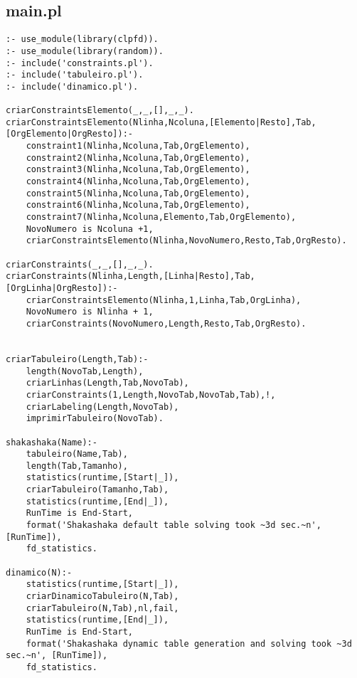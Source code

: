 \documentclass[runningheads]{llncs}
\begin{document}
\subsection{main.pl}
\begin{lstlisting}
:- use_module(library(clpfd)).
:- use_module(library(random)).
:- include('constraints.pl').
:- include('tabuleiro.pl').
:- include('dinamico.pl').

criarConstraintsElemento(_,_,[],_,_).
criarConstraintsElemento(Nlinha,Ncoluna,[Elemento|Resto],Tab,[OrgElemento|OrgResto]):-
    constraint1(Nlinha,Ncoluna,Tab,OrgElemento),
    constraint2(Nlinha,Ncoluna,Tab,OrgElemento),
    constraint3(Nlinha,Ncoluna,Tab,OrgElemento),
    constraint4(Nlinha,Ncoluna,Tab,OrgElemento),
    constraint5(Nlinha,Ncoluna,Tab,OrgElemento),
    constraint6(Nlinha,Ncoluna,Tab,OrgElemento),
    constraint7(Nlinha,Ncoluna,Elemento,Tab,OrgElemento),
    NovoNumero is Ncoluna +1,
    criarConstraintsElemento(Nlinha,NovoNumero,Resto,Tab,OrgResto).

criarConstraints(_,_,[],_,_).
criarConstraints(Nlinha,Length,[Linha|Resto],Tab,[OrgLinha|OrgResto]):-
    criarConstraintsElemento(Nlinha,1,Linha,Tab,OrgLinha),
    NovoNumero is Nlinha + 1,
    criarConstraints(NovoNumero,Length,Resto,Tab,OrgResto).


criarTabuleiro(Length,Tab):-
    length(NovoTab,Length),
    criarLinhas(Length,Tab,NovoTab),
    criarConstraints(1,Length,NovoTab,NovoTab,Tab),!,
    criarLabeling(Length,NovoTab),
    imprimirTabuleiro(NovoTab).

shakashaka(Name):-
    tabuleiro(Name,Tab),
    length(Tab,Tamanho),
    statistics(runtime,[Start|_]),
    criarTabuleiro(Tamanho,Tab),
    statistics(runtime,[End|_]),
    RunTime is End-Start,
    format('Shakashaka default table solving took ~3d sec.~n', [RunTime]),
    fd_statistics.

dinamico(N):-
    statistics(runtime,[Start|_]),
    criarDinamicoTabuleiro(N,Tab),
    criarTabuleiro(N,Tab),nl,fail,
    statistics(runtime,[End|_]),
    RunTime is End-Start,
    format('Shakashaka dynamic table generation and solving took ~3d sec.~n', [RunTime]),
    fd_statistics.
\end{lstlisting}
    
\end{document}
